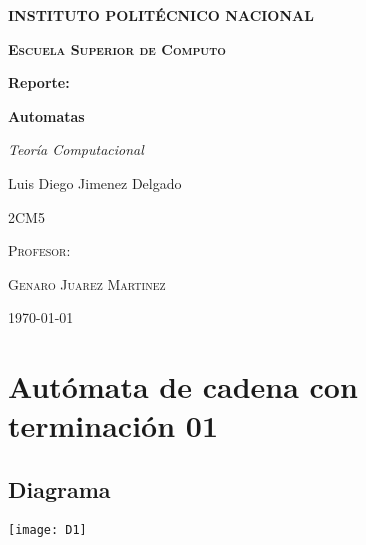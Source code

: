 \documentclass[11pt,a4paper]{report}
\begin{document}
	\begin{titlepage}
		\centering
		{\scshape\huge\bfseries INSTITUTO POLITÉCNICO NACIONAL \par}
		\vspace{0.7cm}
		{\scshape\LARGE\bfseries Escuela Superior de Computo \par}
		\vspace{0.5cm}
		{\scshape\Large \par}
		\vspace{1.5cm}
		{\Large\bfseries Reporte: \par}
		{\huge\bfseries Automatas \par}
		\vspace{2cm}
		{\LARGE\itshape Teoría Computacional\par}
		\vspace{0.2cm}
		{\Large Luis Diego Jimenez Delgado\par}
		\vfill
			{\scshape\Large 2CM5 \par}
			\vspace{0.5cm}
			{\scshape\large Profesor: \par}
			{\scshape\Large Genaro Juarez Martinez \par}
		\vfill
		{\large \today}
	\end{titlepage}
 
	\tableofcontents{}

	\chapter{Autómata de cadena con terminación 01}

	 \section{Diagrama}
		\texttt{[image: D1]}
\end{document}
